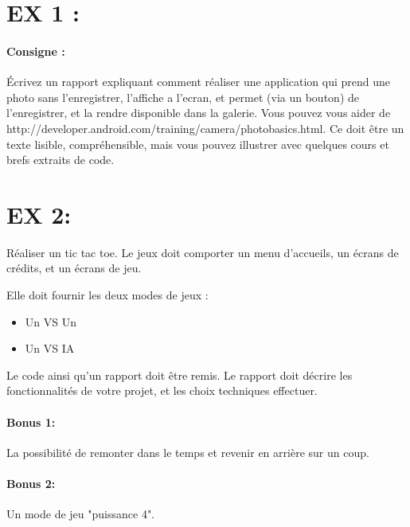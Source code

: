 \documentclass{article}
\begin{document}
\section{EX 1 :} 

\paragraph{Consigne : } Écrivez un rapport expliquant comment réaliser une application qui prend une photo sans l'enregistrer, l'affiche a l'ecran, et permet (via un bouton) de l'enregistrer, et la rendre disponible dans la galerie. Vous pouvez vous aider de http://developer.android.com/training/camera/photobasics.html. Ce doit être un texte lisible, compréhensible, mais vous pouvez illustrer avec quelques cours et brefs extraits de code.


\section{EX 2:}
Réaliser un tic tac toe. Le jeux doit comporter un menu d’accueils, un écrans de crédits, et un écrans de jeu.

Elle doit fournir les deux modes de jeux :
\begin{itemize}
\item Un VS Un
\item Un VS IA
\end{itemize}

Le code ainsi qu'un rapport doit être remis. Le rapport doit décrire les fonctionnalités de votre projet, et les choix techniques effectuer.


\paragraph{Bonus 1:} La possibilité de remonter dans le temps et revenir en arrière sur un coup.

\paragraph{Bonus 2:} Un mode de jeu "puissance 4".
\end{document}

